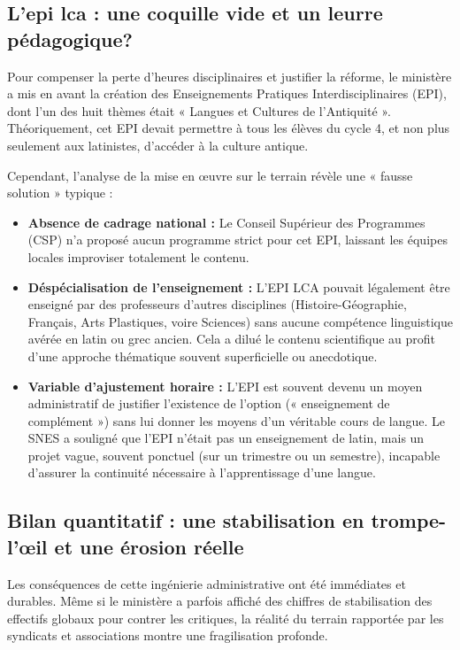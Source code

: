 \subsection{L'epi lca : une coquille vide et un leurre pédagogique?}

Pour compenser la perte d'heures disciplinaires et justifier la réforme, le ministère a mis en avant
la création des Enseignements Pratiques Interdisciplinaires (EPI), dont l'un des huit thèmes était «
Langues et Cultures de l'Antiquité ». Théoriquement, cet EPI devait permettre à tous les élèves du
cycle 4, et non plus seulement aux latinistes, d'accéder à la culture antique.\cite{I-3-2-ref1}

Cependant, l'analyse de la mise en œuvre sur le terrain révèle une « fausse solution » typique :

\begin{itemize}\item \textbf{Absence de cadrage national :} Le Conseil Supérieur des Programmes (CSP) n'a proposé aucun programme strict pour cet EPI, laissant les équipes locales improviser totalement le contenu.\cite{I-3-2-ref9}\item \textbf{Déspécialisation de l'enseignement :} L'EPI LCA pouvait légalement être enseigné par des professeurs d'autres disciplines (Histoire-Géographie, Français, Arts Plastiques, voire Sciences) sans aucune compétence linguistique avérée en latin ou grec ancien. Cela a dilué le contenu scientifique au profit d'une approche thématique souvent superficielle ou anecdotique.\cite{I-3-2-ref8}\item \textbf{Variable d'ajustement horaire :} L'EPI est souvent devenu un moyen administratif de justifier l'existence de l'option (« enseignement de complément ») sans lui donner les moyens d'un véritable cours de langue. Le SNES a souligné que l'EPI n'était pas un enseignement de latin, mais un projet vague, souvent ponctuel (sur un trimestre ou un semestre), incapable d'assurer la continuité nécessaire à l'apprentissage d'une langue.\cite{I-3-2-ref8}\end{itemize}

\subsection{Bilan quantitatif : une stabilisation en trompe-l'œil et une érosion réelle}

Les conséquences de cette ingénierie administrative ont été immédiates et durables. Même si le
ministère a parfois affiché des chiffres de stabilisation des effectifs globaux pour contrer les
critiques, la réalité du terrain rapportée par les syndicats et associations montre une
fragilisation profonde.

